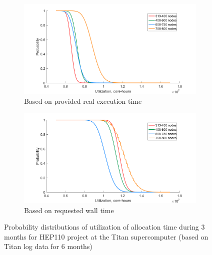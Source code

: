 \begin{figure}
    \centering
    \begin{subfigure}{.48\textwidth}
        \centering
        \includegraphics[width=.98\linewidth]{pics/hep110-probability-distr-exectime.png}
        \caption{Based on provided real execution time}
    \end{subfigure}
    \begin{subfigure}{.48\textwidth}
        \centering
        \includegraphics[width=.98\linewidth]{pics/hep110-probability-distr-walltime.png}
        \caption{Based on requested wall time}
    \end{subfigure}
    \caption{Probability distributions of utilization of allocation time during 3 months for HEP110 project at the Titan supercomputer (based on Titan log data for 6 months)}
    \label{fig-hep110-probability-distr}
\end{figure}
